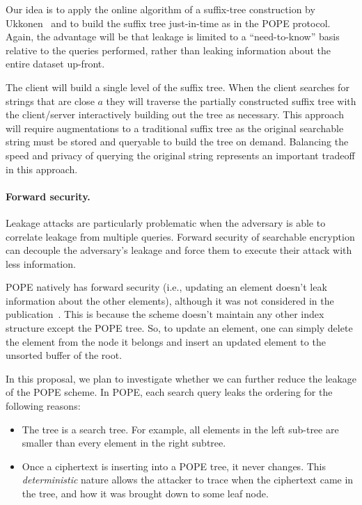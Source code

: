 Our idea is to apply the online algorithm of a suffix-tree construction by
Ukkonen~\cite{Ukkonen95} and to build the suffix tree just-in-time as in
the POPE protocol. Again, the advantage will be that leakage is limited
to a ``need-to-know'' basis relative to the queries performed, rather
than leaking information about the entire dataset up-front.

The client will build a single level of the
suffix tree.  When the client searches for strings that are close $a$ they will
traverse the partially constructed suffix tree with the client/server
interactively building out the tree as necessary.  This approach will require
augmentations to a traditional suffix tree as the original searchable string
must be stored and queryable to build the tree on demand.  Balancing the speed
and privacy of querying the original string represents an important tradeoff in
this approach.

\paragraph{Forward security.} Leakage attacks are particularly problematic when
the adversary is able to correlate leakage from multiple queries.  Forward
security of searchable encryption can decouple the adversary's leakage and force
them to execute their attack with less information.  

POPE natively has forward security (i.e., updating an element doesn't leak
information about the other elements), although it was not considered in the
publication~\cite{CCS:RACY16}.  This is because the scheme doesn't maintain any
other index structure except the POPE tree. So, to update an element, one can
simply delete the element from the node it belongs and insert an updated
element to the unsorted buffer of the root. 

In this proposal, we plan to investigate whether we can further reduce the
leakage of the POPE scheme. 
%
In POPE, each search query leaks the ordering  for the following reasons: 
\begin{itemize}\setlength\itemsep{0em}
\item The tree is a search tree. For example, all elements in the
  left sub-tree are smaller than every element in the right subtree.
\item Once a ciphertext is inserting into a POPE tree, it never changes. This {\em
  deterministic} nature allows the attacker to trace when the ciphertext came
  in the tree, and how it was brought down to some leaf node.  
\end{itemize}

